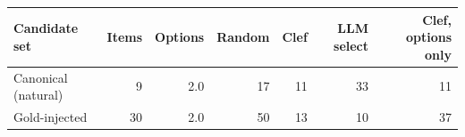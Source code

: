 \begin{tabular}{lrrrrrr}
\toprule
Candidate set & Items & Options & Random & Clef & \textsc{LLM} select & Clef, options only \\
\midrule
Canonical (natural) & 9 & 2.0 & 17 & 11 & 33 & 11 \\
Gold-injected & 30 & 2.0 & 50 & 13 & 10 & 37 \\
\bottomrule
\end{tabular}
